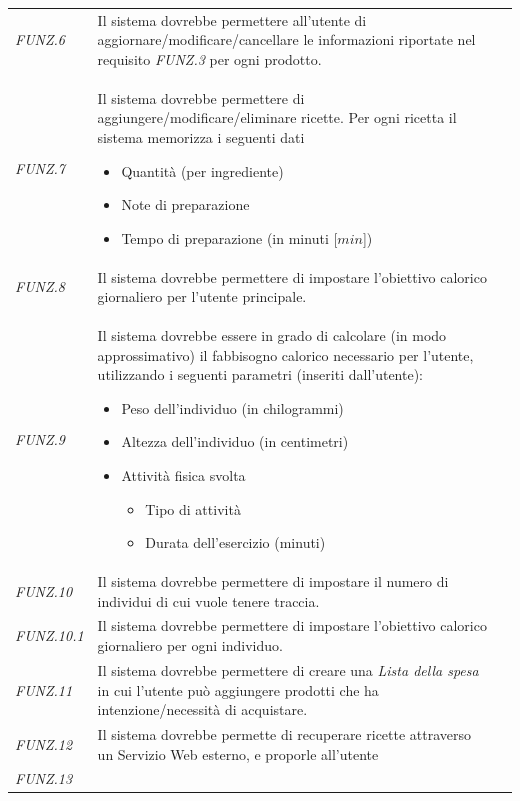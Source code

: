 \documentclass{article}
\newcommand{\must}{\cellcolor{Green}{M}}
\newcommand{\should}{\cellcolor{LimeGreen}{S}}
\newcommand{\could}{\cellcolor{RedOrange}{C}}
\newcommand{\wont}{\cellcolor{BrickRed}{W}}
\begin{document}
\begin{center}
\begin{longtable}{p{50pt}p{250pt}c}
         \textit{FUNZ.6} & Il sistema dovrebbe permettere all'utente di aggiornare/modificare/cancellare le informazioni riportate nel requisito \textit{FUNZ.3} per ogni prodotto. & \must \\
         \textit{FUNZ.7} & Il sistema dovrebbe permettere di aggiungere/modificare/eliminare ricette. Per ogni ricetta il sistema memorizza i seguenti dati
         \begin{itemize}
             \item Quantità (per ingrediente)
             \item Note di preparazione
             \item Tempo di preparazione (in minuti [$min$])
         \end{itemize}& \should \\
         \textit{FUNZ.8} & Il sistema dovrebbe permettere di impostare l'obiettivo calorico giornaliero per l'utente principale.  & \must \\
         \textit{FUNZ.9} & Il sistema dovrebbe essere in grado di calcolare (in modo approssimativo) il fabbisogno calorico necessario per l'utente, utilizzando i seguenti parametri (inseriti dall'utente): \begin{itemize}
             \item Peso dell'individuo (in chilogrammi)
             \item Altezza dell'individuo (in centimetri)
             \item Attività fisica svolta 
             \begin{itemize}
                 \item Tipo di attività 
                 \item Durata dell'esercizio (minuti)
             \end{itemize}
         \end{itemize}  & \wont \\
         \textit{FUNZ.10} & Il sistema dovrebbe permettere di impostare il numero di individui di cui vuole tenere traccia. & \could \\
         \textit{FUNZ.10.1} & Il sistema dovrebbe permettere di impostare l'obiettivo calorico giornaliero per ogni individuo.  & \could \\
         \textit{FUNZ.11} & Il sistema dovrebbe permettere di creare una \textit{Lista della spesa} in cui l'utente può aggiungere prodotti che ha intenzione/necessità di acquistare. & \could \\
         \textit{FUNZ.12} & Il sistema dovrebbe permette di recuperare ricette attraverso un Servizio Web esterno, e proporle all'utente & \wont \\
         \textit{FUNZ.13} &  &  \\
         \bottomrule
    \end{longtable} 
\end{center}
\end{document}
